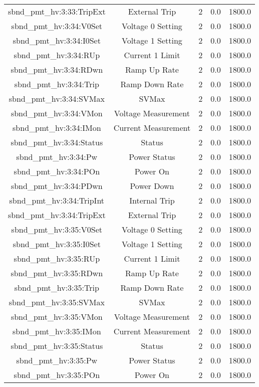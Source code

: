 \begin{table}[ptb]
\begin{tabular}{c | c c c c}
sbnd_pmt_hv:3:33:TripExt & External Trip & 2 & 0.0 & 1800.0\\ 
sbnd_pmt_hv:3:34:V0Set & Voltage 0 Setting & 2 & 0.0 & 1800.0\\ 
sbnd_pmt_hv:3:34:I0Set & Voltage 1 Setting & 2 & 0.0 & 1800.0\\ 
sbnd_pmt_hv:3:34:RUp & Current 1 Limit & 2 & 0.0 & 1800.0\\ 
sbnd_pmt_hv:3:34:RDwn & Ramp Up Rate & 2 & 0.0 & 1800.0\\ 
sbnd_pmt_hv:3:34:Trip & Ramp Down Rate & 2 & 0.0 & 1800.0\\ 
sbnd_pmt_hv:3:34:SVMax & SVMax & 2 & 0.0 & 1800.0\\ 
sbnd_pmt_hv:3:34:VMon & Voltage Measurement & 2 & 0.0 & 1800.0\\ 
sbnd_pmt_hv:3:34:IMon & Current Measurement & 2 & 0.0 & 1800.0\\ 
sbnd_pmt_hv:3:34:Status & Status & 2 & 0.0 & 1800.0\\ 
sbnd_pmt_hv:3:34:Pw & Power Status & 2 & 0.0 & 1800.0\\ 
sbnd_pmt_hv:3:34:POn & Power On & 2 & 0.0 & 1800.0\\ 
sbnd_pmt_hv:3:34:PDwn & Power Down & 2 & 0.0 & 1800.0\\ 
sbnd_pmt_hv:3:34:TripInt & Internal Trip & 2 & 0.0 & 1800.0\\ 
sbnd_pmt_hv:3:34:TripExt & External Trip & 2 & 0.0 & 1800.0\\ 
sbnd_pmt_hv:3:35:V0Set & Voltage 0 Setting & 2 & 0.0 & 1800.0\\ 
sbnd_pmt_hv:3:35:I0Set & Voltage 1 Setting & 2 & 0.0 & 1800.0\\ 
sbnd_pmt_hv:3:35:RUp & Current 1 Limit & 2 & 0.0 & 1800.0\\ 
sbnd_pmt_hv:3:35:RDwn & Ramp Up Rate & 2 & 0.0 & 1800.0\\ 
sbnd_pmt_hv:3:35:Trip & Ramp Down Rate & 2 & 0.0 & 1800.0\\ 
sbnd_pmt_hv:3:35:SVMax & SVMax & 2 & 0.0 & 1800.0\\ 
sbnd_pmt_hv:3:35:VMon & Voltage Measurement & 2 & 0.0 & 1800.0\\ 
sbnd_pmt_hv:3:35:IMon & Current Measurement & 2 & 0.0 & 1800.0\\ 
sbnd_pmt_hv:3:35:Status & Status & 2 & 0.0 & 1800.0\\ 
sbnd_pmt_hv:3:35:Pw & Power Status & 2 & 0.0 & 1800.0\\ 
sbnd_pmt_hv:3:35:POn & Power On & 2 & 0.0 & 1800.0\\ 

\end{tabular}
\end{table}
